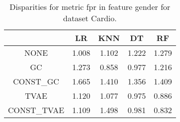 \begin{table}
\caption{Disparities for metric fpr in feature gender for dataset Cardio.}
\label{tab:disp-CARDIO-gender-fpr}
\begin{tabular}{ccccc}
\toprule
 & LR & KNN & DT & RF \\
\midrule
NONE & 1.008 & 1.102 & 1.222 & 1.279 \\
GC & 1.273 & 0.858 & 0.977 & 1.216 \\
CONST\_GC & 1.665 & 1.410 & 1.356 & 1.409 \\
TVAE & 1.120 & 1.077 & 0.975 & 0.886 \\
CONST\_TVAE & 1.109 & 1.498 & 0.981 & 0.832 \\
\bottomrule
\end{tabular}
\end{table}
